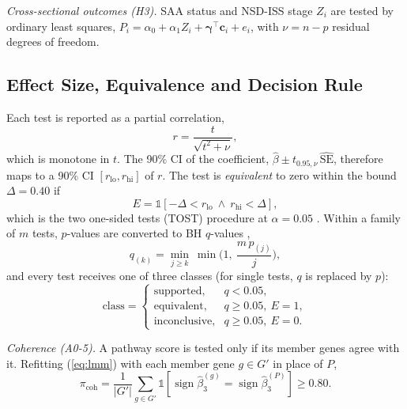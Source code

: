 \emph{Cross-sectional outcomes (H3).} SAA status and NSD-ISS stage $Z_i$ are tested by ordinary
least squares, $P_i = \alpha_0 + \alpha_1 Z_i + \boldsymbol\gamma^\top\mathbf{c}_i + e_i$,
with $\nu = n - p$ residual degrees of freedom.

\subsection{Effect Size, Equivalence and Decision Rule}\label{sec:decision}
Each test is reported as a partial correlation,
\begin{equation}
r = \frac{t}{\sqrt{t^2 + \nu}},
\label{eq:partialr}
\end{equation}
which is monotone in $t$. The 90\% CI of the coefficient,
$\hat\beta \pm t_{0.95,\nu}\,\widehat{\mathrm{SE}}$, therefore maps to a 90\% CI
$[r_{\mathrm{lo}}, r_{\mathrm{hi}}]$ of $r$. The test is \emph{equivalent} to zero within the
bound $\Delta = 0.40$ if
\begin{equation}
E = \mathbb{1}\!\left[-\Delta < r_{\mathrm{lo}}\ \wedge\ r_{\mathrm{hi}} < \Delta\right],
\label{eq:tost}
\end{equation}
which is the two one-sided tests (TOST) procedure at $\alpha = 0.05$ \cite{lakens2017equivalence}.
Within a family of $m$ tests, $p$-values are converted to BH $q$-values \cite{benjamini1995fdr},
\begin{equation}
q_{(k)} = \min_{j \ge k}\ \min\!\Big(1,\ \frac{m\,p_{(j)}}{j}\Big),
\label{eq:bh}
\end{equation}
and every test receives one of three classes (for single tests, $q$ is replaced by $p$):
\begin{equation}
\mathrm{class} =
\begin{cases}
\text{supported}, & q < 0.05,\\
\text{equivalent}, & q \ge 0.05,\ E = 1,\\
\text{inconclusive}, & q \ge 0.05,\ E = 0.
\end{cases}
\label{eq:class}
\end{equation}

\emph{Coherence (A0-5).} A pathway score is tested only if its member genes agree with it. Refitting
(\ref{eq:lmm}) with each member gene $g \in G'$ in place of $P$,
\begin{equation}
\pi_{\mathrm{coh}} = \frac{1}{|G'|}\sum_{g \in G'}
\mathbb{1}\!\left[\operatorname{sign}\hat\beta_3^{(g)} = \operatorname{sign}\hat\beta_3^{(P)}\right] \ge 0.80.
\label{eq:a05}
\end{equation}

